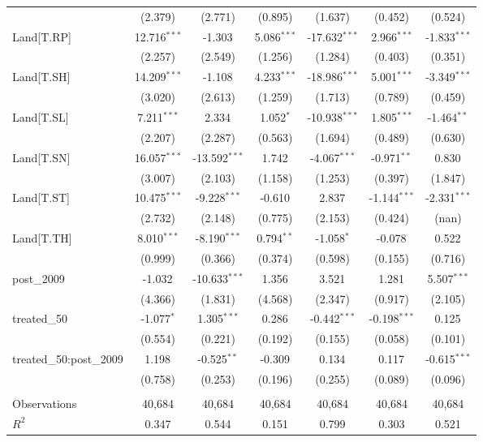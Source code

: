 \begin{table}[!htbp]
\begin{tabular}{@{\extracolsep{5pt}}lcccccc}
  & (2.379) & (2.771) & (0.895) & (1.637) & (0.452) & (0.524) \\
 Land[T.RP] & 12.716$^{***}$ & -1.303$^{}$ & 5.086$^{***}$ & -17.632$^{***}$ & 2.966$^{***}$ & -1.833$^{***}$ \\
  & (2.257) & (2.549) & (1.256) & (1.284) & (0.403) & (0.351) \\
 Land[T.SH] & 14.209$^{***}$ & -1.108$^{}$ & 4.233$^{***}$ & -18.986$^{***}$ & 5.001$^{***}$ & -3.349$^{***}$ \\
  & (3.020) & (2.613) & (1.259) & (1.713) & (0.789) & (0.459) \\
 Land[T.SL] & 7.211$^{***}$ & 2.334$^{}$ & 1.052$^{*}$ & -10.938$^{***}$ & 1.805$^{***}$ & -1.464$^{**}$ \\
  & (2.207) & (2.287) & (0.563) & (1.694) & (0.489) & (0.630) \\
 Land[T.SN] & 16.057$^{***}$ & -13.592$^{***}$ & 1.742$^{}$ & -4.067$^{***}$ & -0.971$^{**}$ & 0.830$^{}$ \\
  & (3.007) & (2.103) & (1.158) & (1.253) & (0.397) & (1.847) \\
 Land[T.ST] & 10.475$^{***}$ & -9.228$^{***}$ & -0.610$^{}$ & 2.837$^{}$ & -1.144$^{***}$ & -2.331$^{***}$ \\
  & (2.732) & (2.148) & (0.775) & (2.153) & (0.424) & (nan) \\
 Land[T.TH] & 8.010$^{***}$ & -8.190$^{***}$ & 0.794$^{**}$ & -1.058$^{*}$ & -0.078$^{}$ & 0.522$^{}$ \\
  & (0.999) & (0.366) & (0.374) & (0.598) & (0.155) & (0.716) \\
 post_2009 & -1.032$^{}$ & -10.633$^{***}$ & 1.356$^{}$ & 3.521$^{}$ & 1.281$^{}$ & 5.507$^{***}$ \\
  & (4.366) & (1.831) & (4.568) & (2.347) & (0.917) & (2.105) \\
 treated_50 & -1.077$^{*}$ & 1.305$^{***}$ & 0.286$^{}$ & -0.442$^{***}$ & -0.198$^{***}$ & 0.125$^{}$ \\
  & (0.554) & (0.221) & (0.192) & (0.155) & (0.058) & (0.101) \\
 treated_50:post_2009 & 1.198$^{}$ & -0.525$^{**}$ & -0.309$^{}$ & 0.134$^{}$ & 0.117$^{}$ & -0.615$^{***}$ \\
  & (0.758) & (0.253) & (0.196) & (0.255) & (0.089) & (0.096) \\
\hline \\[-1.8ex]
 Observations & 40,684 & 40,684 & 40,684 & 40,684 & 40,684 & 40,684 \\
 $R^2$ & 0.347 & 0.544 & 0.151 & 0.799 & 0.303 & 0.521 \\

\end{tabular}
\end{table}
